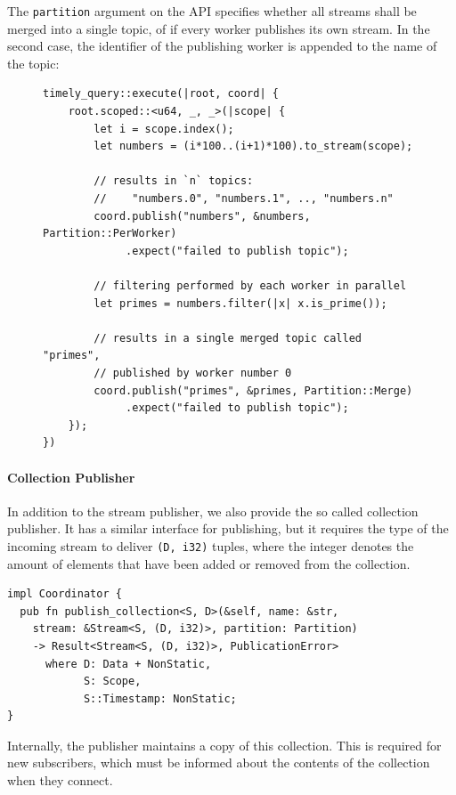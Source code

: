 The \lstinline{partition} argument on the API specifies whether all streams
shall be merged into a single topic, of if every worker publishes its own stream.
In the second case, the identifier of the publishing worker is appended to the
name of the topic:

\begin{figure}[h]
\begin{lstlisting}[caption={
Example use of publisher.
}]
timely_query::execute(|root, coord| {
    root.scoped::<u64, _, _>(|scope| {
        let i = scope.index();
        let numbers = (i*100..(i+1)*100).to_stream(scope);

        // results in `n` topics:
        //    "numbers.0", "numbers.1", .., "numbers.n"
        coord.publish("numbers", &numbers, Partition::PerWorker)
             .expect("failed to publish topic");

        // filtering performed by each worker in parallel
        let primes = numbers.filter(|x| x.is_prime());

        // results in a single merged topic called "primes",
        // published by worker number 0
        coord.publish("primes", &primes, Partition::Merge)
             .expect("failed to publish topic");
    });
})
\end{lstlisting}
\end{figure}


\paragraph{Collection Publisher}

In addition to the stream publisher, we also provide the so called collection
publisher. It has a similar interface for publishing, but it requires the
type of the incoming stream to deliver \lstinline{(D, i32)} tuples, where
the integer denotes the amount of elements that have been added or removed from
the collection.

\begin{lstlisting}[caption={[Collection publisher interface]
}]
impl Coordinator {
  pub fn publish_collection<S, D>(&self, name: &str,
    stream: &Stream<S, (D, i32)>, partition: Partition)
    -> Result<Stream<S, (D, i32)>, PublicationError>
      where D: Data + NonStatic, 
            S: Scope,
            S::Timestamp: NonStatic;
}
\end{lstlisting}

Internally, the publisher maintains a copy of this collection. This is required
for new subscribers, which must be informed about the contents of the collection
when they connect.

